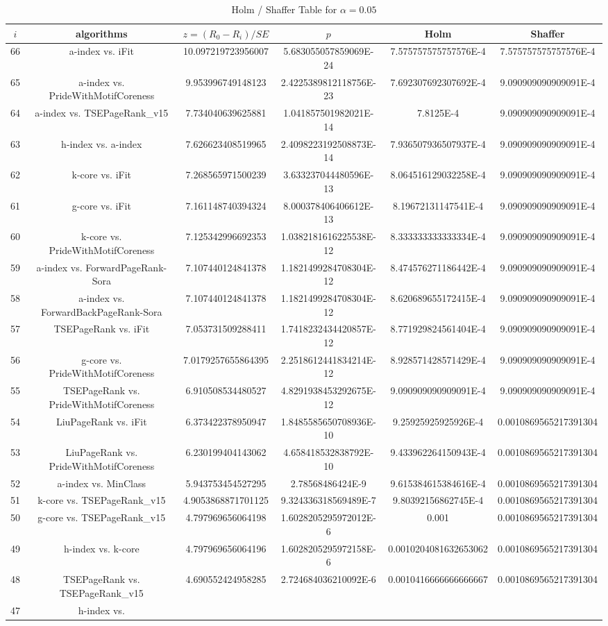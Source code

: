 \documentclass[a4paper,10pt]{article}
\begin{document}
\begin{landscape}
\begin{table}[!htp]
\centering\tiny
\caption{Holm / Shaffer Table for $\alpha=0.05$}
\begin{tabular}{cccccc}
$i$&algorithms&$z=(R_0 - R_i)/SE$&$p$&Holm&Shaffer\\
\hline
66&a-index vs. iFit&10.097219723956007&5.683055057859069E-24&7.575757575757576E-4&7.575757575757576E-4\\65&a-index vs. PrideWithMotifCoreness&9.953996749148123&2.4225389812118756E-23&7.692307692307692E-4&9.090909090909091E-4\\64&a-index vs. TSEPageRank_v15&7.734040639625881&1.041857501982021E-14&7.8125E-4&9.090909090909091E-4\\63&h-index vs. a-index&7.626623408519965&2.4098223192508873E-14&7.936507936507937E-4&9.090909090909091E-4\\62&k-core vs. iFit&7.268565971500239&3.633237044480596E-13&8.064516129032258E-4&9.090909090909091E-4\\61&g-core vs. iFit&7.161148740394324&8.000378406406612E-13&8.19672131147541E-4&9.090909090909091E-4\\60&k-core vs. PrideWithMotifCoreness&7.125342996692353&1.0382181616225538E-12&8.333333333333334E-4&9.090909090909091E-4\\59&a-index vs. ForwardPageRank-Sora&7.107440124841378&1.1821499284708304E-12&8.474576271186442E-4&9.090909090909091E-4\\58&a-index vs. ForwardBackPageRank-Sora&7.107440124841378&1.1821499284708304E-12&8.620689655172415E-4&9.090909090909091E-4\\57&TSEPageRank vs. iFit&7.053731509288411&1.7418232434420857E-12&8.771929824561404E-4&9.090909090909091E-4\\56&g-core vs. PrideWithMotifCoreness&7.0179257655864395&2.2518612441834214E-12&8.928571428571429E-4&9.090909090909091E-4\\55&TSEPageRank vs. PrideWithMotifCoreness&6.910508534480527&4.8291938453292675E-12&9.090909090909091E-4&9.090909090909091E-4\\54&LiuPageRank vs. iFit&6.373422378950947&1.8485585650708936E-10&9.25925925925926E-4&0.0010869565217391304\\53&LiuPageRank vs. PrideWithMotifCoreness&6.230199404143062&4.658418532838792E-10&9.433962264150943E-4&0.0010869565217391304\\52&a-index vs. MinClass&5.943753454527295&2.78568486424E-9&9.615384615384616E-4&0.0010869565217391304\\51&k-core vs. TSEPageRank_v15&4.9053868871701125&9.324336318569489E-7&9.80392156862745E-4&0.0010869565217391304\\50&g-core vs. TSEPageRank_v15&4.797969656064198&1.6028205295972012E-6&0.001&0.0010869565217391304\\49&h-index vs. k-core&4.797969656064196&1.6028205295972158E-6&0.0010204081632653062&0.0010869565217391304\\48&TSEPageRank vs. TSEPageRank_v15&4.690552424958285&2.724684036210092E-6&0.0010416666666666667&0.0010869565217391304\\47&h-index vs. 
\end{tabular}
\end{table}
\end{landscape}
\end{document}
